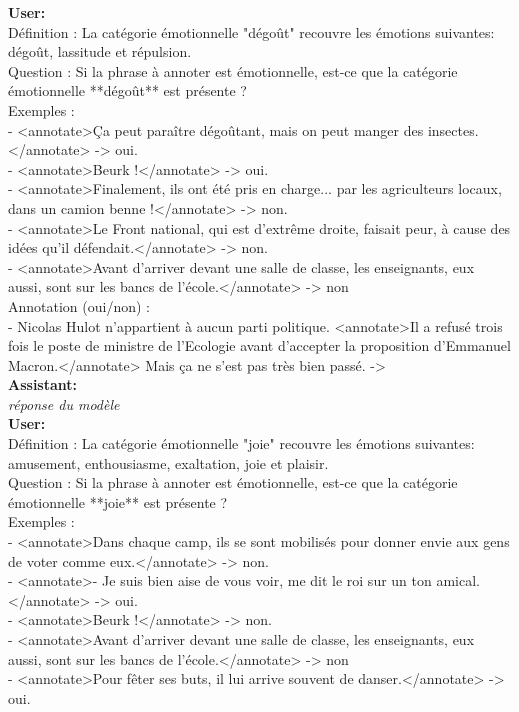 {\textbf{User:}\\
Définition : La catégorie émotionnelle "dégoût" recouvre les émotions suivantes: dégoût, lassitude et répulsion.\\

Question : Si la phrase à annoter est émotionnelle, est-ce que la catégorie émotionnelle **dégoût** est présente ?\\

Exemples :\\
- <annotate>Ça peut paraître dégoûtant, mais on peut manger des insectes.</annotate> -> oui.\\
- <annotate>Beurk !</annotate> -> oui.\\
- <annotate>Finalement, ils ont été pris en charge... par les agriculteurs locaux, dans un camion benne !</annotate> -> non.\\
- <annotate>Le Front national, qui est d'extrême droite, faisait peur, à cause des idées qu'il défendait.</annotate> -> non.\\
- <annotate>Avant d'arriver devant une salle de classe, les enseignants, eux aussi, sont sur les bancs de l'école.</annotate> -> non\\

Annotation (oui/non) :\\
- Nicolas Hulot n’appartient à aucun parti politique. <annotate>Il a refusé trois fois le poste de ministre de l’Ecologie avant d’accepter la proposition d’Emmanuel Macron.</annotate> Mais ça ne s’est pas très bien passé.  -> \\

\textbf{Assistant:}\\
\textit{réponse du modèle}\\

\textbf{User:}\\
Définition : La catégorie émotionnelle "joie" recouvre les émotions suivantes: amusement, enthousiasme, exaltation, joie et plaisir.\\

Question : Si la phrase à annoter est émotionnelle, est-ce que la catégorie émotionnelle **joie** est présente ?\\

Exemples :\\
- <annotate>Dans chaque camp, ils se sont mobilisés pour donner envie aux gens de voter comme eux.</annotate> -> non.\\
- <annotate>- Je suis bien aise de vous voir, me dit le roi sur un ton amical.</annotate> -> oui.\\
- <annotate>Beurk !</annotate> -> non.\\
- <annotate>Avant d'arriver devant une salle de classe, les enseignants, eux aussi, sont sur les bancs de l'école.</annotate> -> non\\
- <annotate>Pour fêter ses buts, il lui arrive souvent de danser.</annotate> -> oui.\\

}
